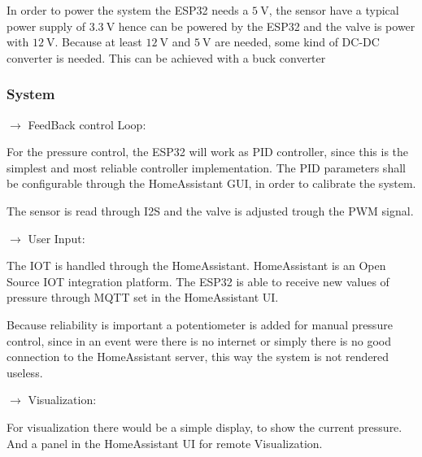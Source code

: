 In order to power the system the ESP32 needs a $\SI{5}{\V}$, the sensor have a typical power supply of $\SI{3.3}{\V}$ hence can be powered by the ESP32 and the valve is power with $\SI{12}{\V}$. Because at least $\SI{12}{\V}$ and $\SI{5}{\V}$ are needed, some kind of DC-DC converter is needed. This can be achieved with a buck converter

\subsubsection{System}

$\rightarrow$ FeedBack control Loop:

For the pressure control, the ESP32 will work as PID controller, since this is the simplest and most reliable controller implementation. The PID parameters shall be configurable through the HomeAssistant GUI, in order to calibrate the system.

The sensor is read through I2S and the valve is adjusted trough the PWM signal.

$\rightarrow$ User Input:

The IOT is handled through the HomeAssistant. HomeAssistant is an Open Source IOT integration platform. The ESP32 is able to receive new values of pressure through MQTT set in the HomeAssistant UI. 

Because reliability is important a potentiometer is added for manual pressure control, since in an event were there is no internet or simply there is no good connection to the HomeAssistant server, this way the system is not rendered useless.

$\rightarrow$ Visualization:

For visualization there would be a simple display, to show the current pressure. And a panel in the HomeAssistant UI for remote Visualization.
